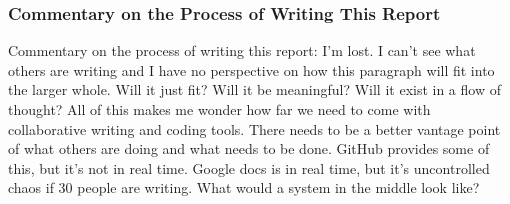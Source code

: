 \subsubsection{Commentary on the Process of Writing This Report}
Commentary on the process of writing this report: I’m lost. I can’t see what others are writing and I have no perspective on how this paragraph will fit into the larger whole. Will it just fit? Will it be meaningful? Will it exist in a flow of thought? All of this makes me wonder how far we need to come with collaborative writing and coding tools. There needs to be a better vantage point of what others are doing and what needs to be done. GitHub provides some of this, but it’s not in real time. Google docs is in real time, but it’s uncontrolled chaos if 30 people are writing. What would a system in the middle look like?
